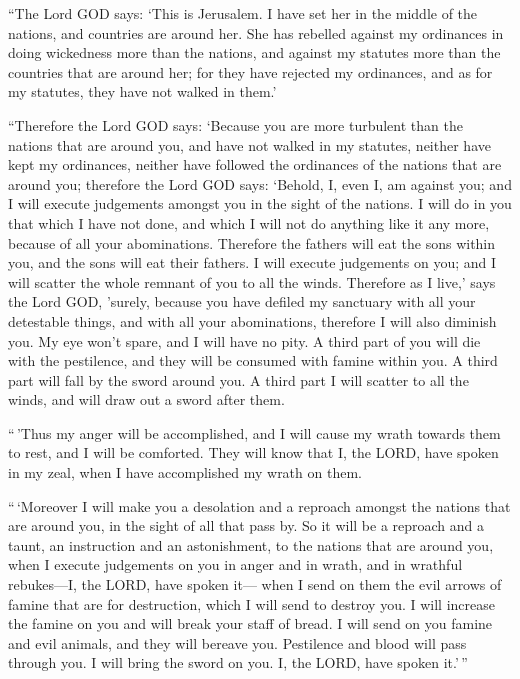  ``The Lord GOD says: `This is Jerusalem. I have set her in
the middle of the nations, and countries are around her. 
She has rebelled against my ordinances in doing wickedness more than the
nations, and against my statutes more than the countries that are around
her; for they have rejected my ordinances, and as for my statutes, they
have not walked in them.'

 ``Therefore the Lord GOD says: `Because you are more
turbulent than the nations that are around you, and have not walked in
my statutes, neither have kept my ordinances, neither have followed the
ordinances of the nations that are around you;  therefore
the Lord GOD says: `Behold, I, even I, am against you; and I will
execute judgements amongst you in the sight of the nations. 
I will do in you that which I have not done, and which I will not do
anything like it any more, because of all your abominations.
 Therefore the fathers will eat the sons within you, and
the sons will eat their fathers. I will execute judgements on you; and I
will scatter the whole remnant of you to all the winds. 
Therefore as I live,' says the Lord GOD, 'surely, because you have
defiled my sanctuary with all your detestable things, and with all your
abominations, therefore I will also diminish you. My eye won't spare,
and I will have no pity.  A third part of you will die with
the pestilence, and they will be consumed with famine within you. A
third part will fall by the sword around you. A third part I will
scatter to all the winds, and will draw out a sword after them.

 ``\,'Thus my anger will be accomplished, and I will cause
my wrath towards them to rest, and I will be comforted. They will know
that I, the LORD, have spoken in my zeal, when I have accomplished my
wrath on them.

 ``\,`Moreover I will make you a desolation and a reproach
amongst the nations that are around you, in the sight of all that pass
by.  So it will be a reproach and a taunt, an instruction
and an astonishment, to the nations that are around you, when I execute
judgements on you in anger and in wrath, and in wrathful rebukes---I,
the LORD, have spoken it---  when I send on them the evil
arrows of famine that are for destruction, which I will send to destroy
you. I will increase the famine on you and will break your staff of
bread.  I will send on you famine and evil animals, and
they will bereave you. Pestilence and blood will pass through you. I
will bring the sword on you. I, the LORD, have spoken it.'\,''


